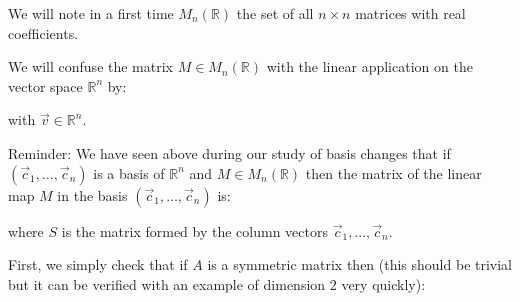 	We will note in a first time $M_n(\mathbb{R})$ the set of all $n\times n$ matrices with real coefficients.
	
	We will confuse the matrix $M\in M_n (\mathbb{R})$ with the linear application on the vector space $\mathbb{R}^n$ by:
	
	with $\vec{v}\in \mathbb{R}^n$.
	
	Reminder: We have seen above during our study of basis changes that if $(\vec{c}_1,\ldots,\vec{c}_n)$ is a basis of $\mathbb{R}^n$ and $M\in M_n(\mathbb{R})$ then the matrix of the linear map $M$ in the basis $(\vec{c}_1,\ldots,\vec{c}_n)$  is:
	
	where $S$ is the matrix formed by the column vectors $\vec{c}_1,...,\vec{c}_n$.
	
	First, we simply check that if $A$ is a symmetric matrix then (this should be trivial but it can be verified with an example of dimension $2$ very quickly):
	
